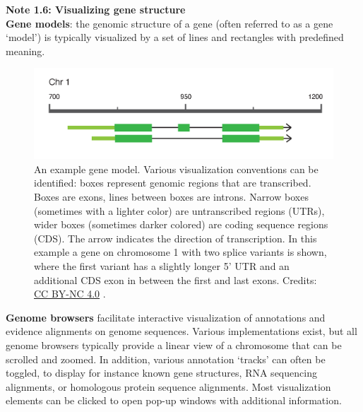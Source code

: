 \begin{framed}
\textbf{Note 1.6: Visualizing gene structure}\\
\textbf{Gene models}: the genomic structure of a gene (often referred to as a gene `model') is typically visualized by a set of lines and rectangles with predefined meaning.

\begin{figure}[!htbp]
\centering
\includegraphics[width=1\linewidth]{files/genemodel-7bb5f6683cb808b770f42927d7e7aacb.png}
\caption[]{An example gene model.
Various visualization conventions can be identified: boxes represent genomic regions that are transcribed.
Boxes are exons, lines between boxes are introns. Narrow boxes (sometimes with a lighter color) are untranscribed regions (UTRs), wider boxes (sometimes darker colored) are coding sequence regions (CDS).
The arrow indicates the direction of transcription.
In this example a gene on chromosome 1 with two splice variants is shown, where the first variant has a slightly longer 5' UTR and an additional CDS exon in between the first and last exons.
Credits: \href{https://creativecommons.org/licenses/by-nc/4.0/}{CC BY-NC 4.0} \cite{own_1_2024}.}
\label{genemodel}
\end{figure}

\textbf{Genome browsers} facilitate interactive visualization of annotations and evidence alignments on genome sequences.
Various implementations exist, but all genome browsers typically provide a linear view of a chromosome that can be scrolled and zoomed.
In addition, various annotation `tracks' can often be toggled, to display for instance known gene structures, RNA sequencing alignments, or homologous protein sequence alignments.
Most visualization elements can be clicked to open pop-up windows with additional information.


\end{framed}
